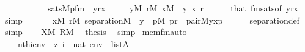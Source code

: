 \begin{isabellebody}
\ \ \ \ \ \ \ \ \ \ {\isasymlongleftrightarrow}\ sats{\isacharparenleft}{\kern0pt}M{\isacharcomma}{\kern0pt}pfm{\isacharparenleft}{\kern0pt}{}{\isacharcomma}{\kern0pt}{}{\isacharcomma}{\kern0pt}{}{\isacharparenright}{\kern0pt}\ {\isacharcomma}{\kern0pt}\ {\isacharbrackleft}{\kern0pt}y{\isacharcomma}{\kern0pt}r{\isacharcomma}{\kern0pt}x{\isacharbrackright}{\kern0pt}{\isacharparenright}{\kern0pt}{\isachardoublequoteclose}\isanewline
\ \ \ \ \ {\isachardoublequoteopen}y{\isasymin}M{\isachardoublequoteclose}\ {\isachardoublequoteopen}r{\isasymin}M{\isachardoublequoteclose}\ {\isachardoublequoteopen}x{\isasymin}M{\isachardoublequoteclose}\ \ y\ x\ r\isanewline
\ \ \ \ \isamarkupfalse%
\ that\ fmsats{\isacharbrackleft}{\kern0pt}of\ {\isachardoublequoteopen}{\isacharbrackleft}{\kern0pt}y{\isacharcomma}{\kern0pt}r{\isacharcomma}{\kern0pt}x{\isacharbrackright}{\kern0pt}{\isachardoublequoteclose}{\isacharbrackright}{\kern0pt}\ \isamarkupfalse%
\ simp\isanewline
\ \ \isamarkupfalse%
\isanewline
\ \ \isamarkupfalse%
\ {\isachardoublequoteopen}{\isasymforall}x{\isasymin}M{\isachardot}{\kern0pt}\ {\isasymforall}r{\isasymin}M{\isachardot}{\kern0pt}\ separation{\isacharparenleft}{\kern0pt}{\isacharhash}{\kern0pt}{\isacharhash}{\kern0pt}M{\isacharcomma}{\kern0pt}\ {\isasymlambda}\ y\ {\isachardot}{\kern0pt}\ {\isasymexists}p{\isasymin}M{\isachardot}{\kern0pt}\ p{\isasymin}r\ {\isacharampersand}{\kern0pt}\ pair{\isacharparenleft}{\kern0pt}{\isacharhash}{\kern0pt}{\isacharhash}{\kern0pt}M{\isacharcomma}{\kern0pt}y{\isacharcomma}{\kern0pt}x{\isacharcomma}{\kern0pt}p{\isacharparenright}{\kern0pt}{\isacharparenright}{\kern0pt}{\isachardoublequoteclose}\isanewline
\ \ \ \ \isamarkupfalse%
\ separation{\isacharunderscore}{\kern0pt}def\ \isamarkupfalse%
\ simp\isanewline
\ \ \isamarkupfalse%
\ {\isacartoucheopen}X{\isasymin}M{\isacartoucheclose}\ {\isacartoucheopen}R{\isasymin}M{\isacartoucheclose}\ \isamarkupfalse%
\ {\isacharquery}{\kern0pt}thesis\ \isamarkupfalse%
\ simp\isanewline
{}\isamarkupfalse%
%
\endisatagproof
{\isafoldproof}%
%
\isadelimproof
\isanewline
%
\endisadelimproof
\isanewline
\isanewline
{}\isamarkupfalse%
\ mem{\isacharunderscore}{\kern0pt}fm{\isacharunderscore}{\kern0pt}auto{\isacharcolon}{\kern0pt}\isanewline
\ \ \isanewline
\ \ \ \ {\isachardoublequoteopen}nth{\isacharparenleft}{\kern0pt}i{\isacharcomma}{\kern0pt}env{\isacharparenright}{\kern0pt}\ {\isacharequal}{\kern0pt}\ z{\isachardoublequoteclose}\ {\isachardoublequoteopen}i\ {\isasymin}\ nat{\isachardoublequoteclose}\ {\isachardoublequoteopen}env\ {\isasymin}\ list{\isacharparenleft}{\kern0pt}A{\isacharparenright}{\kern0pt}{\isachardoublequoteclose}\isanewline

\end{isabellebody}
